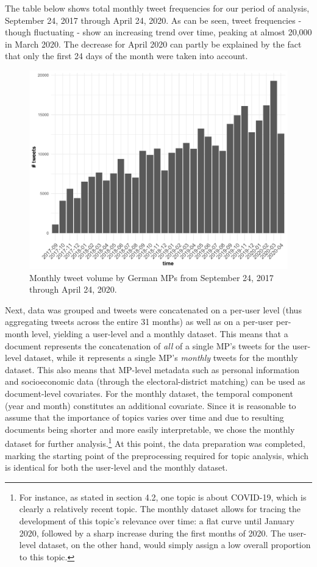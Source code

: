 The table below shows total monthly tweet frequencies for our period of analysis, September 24, 2017 through April 24, 2020. As can be seen, tweet frequencies - though fluctuating - show an increasing trend over time, peaking at almost 20,000 in March 2020. The decrease for April 2020 can partly be explained by the fact that only the first 24 days of the month were taken into account.

\begin{figure}[h!]
  \centering
  \captionsetup{justification=centering,margin=2cm}
  \includegraphics[scale = 0.5]{../plots/3/monthly_tweets.pdf}
  \caption{Monthly tweet volume by German MPs from September 24, 2017 through April 24, 2020.}
  \label{fig:monthly_tweets}
\end{figure}

Next, data was grouped and tweets were concatenated on a per-user level (thus aggregating tweets across the entire 31 months) as well as on a per-user per-month level, yielding a user-level and a monthly dataset. This means that a document represents the concatenation of \textit{all} of a single MP's tweets for the user-level dataset, while it represents a single MP's \textit{monthly} tweets for the monthly dataset. This also means that MP-level metadata such as personal information and socioeconomic data (through the electoral-district matching) can be used as document-level covariates. For the monthly dataset, the temporal component (year and month) constitutes an additional covariate. Since it is reasonable to assume that the importance of topics varies over time and due to resulting documents being shorter and more easily interpretable, we chose the monthly dataset for further analysis.\footnote{For instance, as stated in section 4.2, one topic is about COVID-19, which is clearly a relatively recent topic. The monthly dataset allows for tracing the development of this topic's relevance over time: a flat curve until January 2020, followed by a sharp increase during the first months of 2020. The user-level dataset, on the other hand, would simply assign a low overall proportion to this topic.} At this point, the data preparation was completed, marking the starting point of the preprocessing required for topic analysis, which is identical for both the user-level and the monthly dataset.

